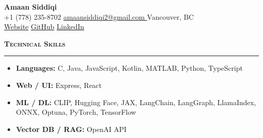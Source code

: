 \documentclass[11pt, letterpaper]{article}
\newcommand{\resumesection}[1]{
  \vspace{8pt} %
  {\large\bfseries\scshape\color{black}#1} %
  \vspace{3pt} %
  \hrule height 0.8pt %
  \vspace{8pt} %
}
\begin{document}
\begin{center}
  {\Huge\bfseries Amaan Siddiqi} \\ \vspace{4pt}
  \small
  +1 (778) 235-8702 \color{gray}\textbullet\color{black}
  \href{mailto:amaansiddiqi2@gmail.com}{ amaansiddiqi2@gmail.com } \color{gray}\textbullet\color{black}
  Vancouver, BC \\ \vspace{2pt}
  \href{https://amaansiddiqi.me}{Website} \color{gray}\textbullet\color{black}
  \href{https://github.com/amaansiddiqi}{GitHub} \color{gray}\textbullet\color{black}
  \href{https://linkedin.com/in/amaan-siddiqi-38b7021b0}{LinkedIn}
\end{center}

\resumesection{Technical Skills}
\begin{itemize}[itemsep=1pt]\item \textbf{ Languages:} C, Java, JavaScript, Kotlin, MATLAB, Python, TypeScript\item \textbf{ Web / UI:} Express, React\item \textbf{ ML / DL:} CLIP, Hugging Face, JAX, LangChain, LangGraph, LlamaIndex, ONNX, Optuna, PyTorch, TensorFlow\item \textbf{ Vector DB / RAG:} OpenAI API\end{itemize}
\end{document}
